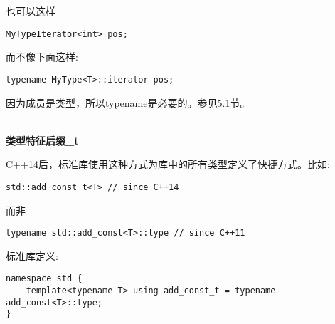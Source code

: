 也可以这样

\begin{lstlisting}[style=styleCXX]
MyTypeIterator<int> pos;
\end{lstlisting}

而不像下面这样:

\begin{lstlisting}[style=styleCXX]
typename MyType<T>::iterator pos;
\end{lstlisting}

\begin{tcolorbox}[colback=webgreen!5!white,colframe=webgreen!75!black]
\hspace*{0.75cm}因为成员是类型，所以typename是必要的。参见5.1节。
\end{tcolorbox}

\hspace*{\fill} \\ %
\noindent
\textbf{类型特征后缀\_t}

C++14后，标准库使用这种方式为库中的所有类型定义了快捷方式。比如:

\begin{lstlisting}[style=styleCXX]
std::add_const_t<T> // since C++14
\end{lstlisting}

而非

\begin{lstlisting}[style=styleCXX]
typename std::add_const<T>::type // since C++11
\end{lstlisting}

标准库定义:

\begin{lstlisting}[style=styleCXX]
namespace std {
	template<typename T> using add_const_t = typename add_const<T>::type;
}
\end{lstlisting}




